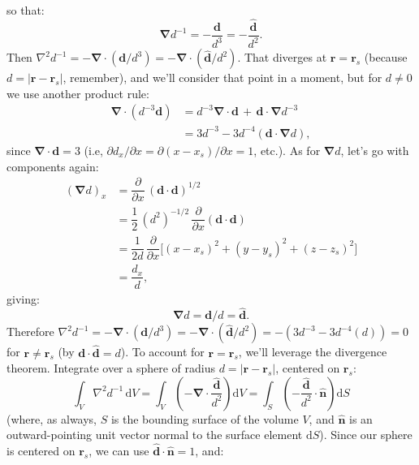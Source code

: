 \documentclass[12pt]{article}
\renewcommand{\vv}[1]{\mathbf{#1}}
\newcommand{\dd}[1]{\mathrm{d}#1}
\newcommand{\del}{\boldsymbol{\nabla}}
\begin{document}
so that:
\begin{equation}\label{eq:gradoverr}
\del d^{-1} = - \dfrac{\vv d}{d^3} = - \dfrac{\vv{\hat{d}}}{d^2}.
\end{equation}
Then $\nabla^2 d^{-1} = - \del \cdot (\vv d / d^3) = - \del \cdot ( \vv{\hat{d}}/d^2 )$. That diverges at $\vv r = \vv r_{s}$ (because $d = \vert \vv r - \vv r_{s} \vert $, remember), and we'll consider that point in a moment, but for $d \neq 0$ we use another product rule:
\begin{equation*}
\begin{aligned}
\del \cdot (d^{-3} \vv d) &= d^{-3} \del \cdot \vv d  \, + \, \vv d \cdot \del d^{-3}  \\[3pt]
&= 3 d^{-3} - 3 d^{-4} \left( \vv d \cdot \del d \right) ,
\end{aligned}
\end{equation*}
since $\del \cdot \vv d = 3$ (i.e, $\partial d_x / \partial x = \partial (x - x_{s}) / \partial x = 1$, etc.). As for $\del d$, let's go with components again:
\begin{equation*}
\begin{aligned}
(\del d)_x &= \dfrac{\partial}{\partial x} \, ( \vv d \cdot \vv d ) ^{1/2} \\[3pt]
&= \dfrac{1}{2} \, (d^2)^{-1/2} \, \dfrac{\partial}{\partial x} (\vv d \cdot \vv d) \\[3pt]
&= \dfrac{1}{2d} \, \dfrac{\partial}{\partial x} \big[ (x - x_{s})^2 + (y - y_{s})^2 + (z - z_{s})^2 \big] \\[3pt]
&= \dfrac{d_x}{d} ,
\end{aligned}
\end{equation*}
giving:
\begin{equation}\label{eq:deld}
\del d = \vv d / d = \vv{\hat{d}} .
\end{equation}
Therefore $\nabla^2 d^{-1} = - \del \cdot ( \vv d / d^3 ) = - \del \cdot ( \vv{\hat{d}}/d^2 ) = - (3 d^{-3} - 3 d^{-4} (d)) = 0$ for $\vv r \neq \vv r_{s}$ (by $\vv d \cdot \vv{\hat{d}} = d$). To account for $\vv r = \vv r_{s}$, we'll leverage the divergence theorem. Integrate over a sphere of radius $d = \vert \vv r - \vv r_{s} \vert$, centered on $\vv r_{s}$:
\begin{equation*}
\int_V \nabla^2 d^{-1} \, \dd V = \int_V \left( - \del \cdot \dfrac{\vv{\hat{d}}}{d^2} \right) \dd V = \int_S \left( - \dfrac{\vv{\hat{d}}}{d^2} \cdot \vv{\hat{n}} \right) \dd S
\end{equation*}
(where, as always, $S$ is the bounding surface of the volume $V$, and $\vv{\hat{n}}$ is an outward-pointing unit vector normal to the surface element $\dd S$). Since our sphere is centered on $\vv r_{s}$, we can use $\vv{\hat{d}} \cdot \vv{\hat{n}} = 1$, and:
\end{document}
